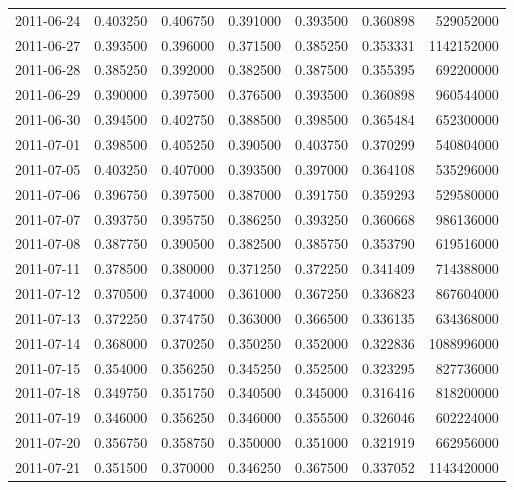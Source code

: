 \begin{tabular}{lrrrrrr}
2011-06-24 &    0.403250 &    0.406750 &    0.391000 &    0.393500 &    0.360898 &   529052000 \\
2011-06-27 &    0.393500 &    0.396000 &    0.371500 &    0.385250 &    0.353331 &  1142152000 \\
2011-06-28 &    0.385250 &    0.392000 &    0.382500 &    0.387500 &    0.355395 &   692200000 \\
2011-06-29 &    0.390000 &    0.397500 &    0.376500 &    0.393500 &    0.360898 &   960544000 \\
2011-06-30 &    0.394500 &    0.402750 &    0.388500 &    0.398500 &    0.365484 &   652300000 \\
2011-07-01 &    0.398500 &    0.405250 &    0.390500 &    0.403750 &    0.370299 &   540804000 \\
2011-07-05 &    0.403250 &    0.407000 &    0.393500 &    0.397000 &    0.364108 &   535296000 \\
2011-07-06 &    0.396750 &    0.397500 &    0.387000 &    0.391750 &    0.359293 &   529580000 \\
2011-07-07 &    0.393750 &    0.395750 &    0.386250 &    0.393250 &    0.360668 &   986136000 \\
2011-07-08 &    0.387750 &    0.390500 &    0.382500 &    0.385750 &    0.353790 &   619516000 \\
2011-07-11 &    0.378500 &    0.380000 &    0.371250 &    0.372250 &    0.341409 &   714388000 \\
2011-07-12 &    0.370500 &    0.374000 &    0.361000 &    0.367250 &    0.336823 &   867604000 \\
2011-07-13 &    0.372250 &    0.374750 &    0.363000 &    0.366500 &    0.336135 &   634368000 \\
2011-07-14 &    0.368000 &    0.370250 &    0.350250 &    0.352000 &    0.322836 &  1088996000 \\
2011-07-15 &    0.354000 &    0.356250 &    0.345250 &    0.352500 &    0.323295 &   827736000 \\
2011-07-18 &    0.349750 &    0.351750 &    0.340500 &    0.345000 &    0.316416 &   818200000 \\
2011-07-19 &    0.346000 &    0.356250 &    0.346000 &    0.355500 &    0.326046 &   602224000 \\
2011-07-20 &    0.356750 &    0.358750 &    0.350000 &    0.351000 &    0.321919 &   662956000 \\
2011-07-21 &    0.351500 &    0.370000 &    0.346250 &    0.367500 &    0.337052 &  1143420000 \\

\end{tabular}
